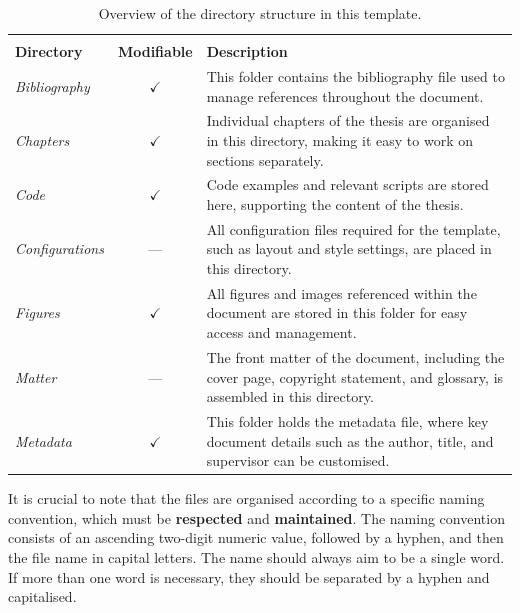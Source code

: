 \begin{table}[!htpb]
    \setlength{\extrarowheight}{2pt}
    \caption[Directory structure and file organisation]{Overview of the directory structure in this template.}
    \label{tab:file-structure}
    \begin{tabularx}{\textwidth}{lcX}
        \toprule
        \\[-1.5\normalbaselineskip]
        \textbf{Directory}      & \textbf{Modifiable} & \textbf{Description}                                                                                                           \\ [0em]
        \midrule
        \textit{Bibliography}   & \(\checkmark\)      & This folder contains the bibliography file used to manage references throughout the document.                                  \\
        \textit{Chapters}       & \(\checkmark\)      & Individual chapters of the thesis are organised in this directory, making it easy to work on sections separately.              \\
        \textit{Code}           & \(\checkmark\)      & Code examples and relevant scripts are stored here, supporting the content of the thesis.                                      \\
        \textit{Configurations} & ---                 & All configuration files required for the template, such as layout and style settings, are placed in this directory.            \\
        \textit{Figures}        & \(\checkmark\)      & All figures and images referenced within the document are stored in this folder for easy access and management.                \\
        \textit{Matter}         & ---                 & The front matter of the document, including the cover page, copyright statement, and glossary, is assembled in this directory. \\
        \textit{Metadata}       & \(\checkmark\)      & This folder holds the metadata file, where key document details such as the author, title, and supervisor can be customised.   \\
        \bottomrule
    \end{tabularx}
\end{table}

It is crucial to note that the files are organised according to a specific naming convention, which must be \textbf{respected} and \textbf{maintained}. The naming convention consists of an ascending two-digit numeric value, followed by a hyphen, and then the file name in capital letters. The name should always aim to be a single word. If more than one word is necessary, they should be separated by a hyphen and capitalised.

